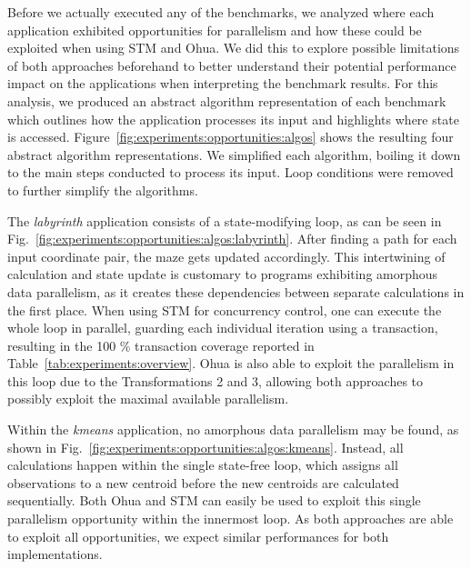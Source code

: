 Before we actually executed any of the benchmarks, we analyzed where each application exhibited opportunities for parallelism and how these could be exploited when using STM and Ohua.
We did this to explore possible limitations of both approaches beforehand to better understand their potential performance impact on the applications when interpreting the benchmark results.
For this analysis, we produced an abstract algorithm representation of each benchmark which outlines how the application processes its input and highlights where state is accessed.
Figure~\ref{fig:experiments:opportunities:algos} shows the resulting four abstract algorithm representations.
We simplified each algorithm, boiling it down to the main steps conducted to process its input.
Loop conditions were removed to further simplify the algorithms.

The \emph{labyrinth} application consists of a state-modifying loop, as can be seen in Fig.~\ref{fig:experiments:opportunities:algos:labyrinth}.
After finding a path for each input coordinate pair, the maze gets updated accordingly.
This intertwining of calculation and state update is customary to programs exhibiting amorphous data parallelism, as it creates these dependencies between separate calculations in the first place.
When using STM for concurrency control, one can execute the whole loop in parallel, guarding each individual iteration using a transaction, resulting in the 100 \% transaction coverage reported in Table~\ref{tab:experiments:overview}.
Ohua is also able to exploit the parallelism in this loop due to the Transformations 2 and 3, allowing both approaches to possibly exploit the maximal available parallelism.

Within the \emph{kmeans} application, no amorphous data parallelism may be found, as shown in Fig.~\ref{fig:experiments:opportunities:algos:kmeans}.
Instead, all calculations happen within the single state-free loop, which assigns all observations to a new centroid before the new centroids are calculated sequentially.
Both Ohua and STM can easily be used to exploit this single parallelism opportunity within the innermost loop.
As both approaches are able to exploit all opportunities, we expect similar performances for both implementations.

